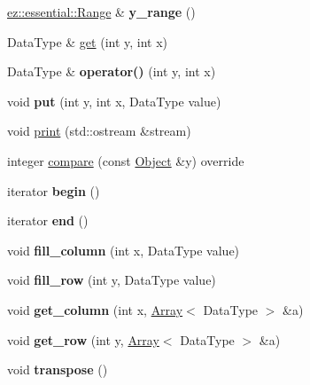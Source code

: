 \begin{DoxyCompactItemize}
\mbox{\label{classez_1_1objects_1_1Matrix2D_a0358977f3d99b47af02fca8b2c9ae698}} 
\hyperlink{classez_1_1essential_1_1Range}{ez\+::essential\+::\+Range} \& {\bfseries y\+\_\+range} ()
\item 
Data\+Type \& \hyperlink{classez_1_1objects_1_1Matrix2D_a43445a3d46105c71f6e212c2b996bced}{get} (int y, int x)
\item 
\mbox{\label{classez_1_1objects_1_1Matrix2D_a6191b365c96c388d82d7a205f979a30e}} 
Data\+Type \& {\bfseries operator()} (int y, int x)
\item 
\mbox{\label{classez_1_1objects_1_1Matrix2D_ab733a21ed5cb3ad3980c15af20ec066a}} 
void {\bfseries put} (int y, int x, Data\+Type value)
\item 
void \hyperlink{classez_1_1objects_1_1Matrix2D_aeef806111fdd458dfcf1f09addd7a0b7}{print} (std\+::ostream \&stream)
\item 
integer \hyperlink{classez_1_1objects_1_1Matrix2D_ab0b55556ba7c31aa5ad376a91b63d6c3}{compare} (const \hyperlink{classez_1_1objects_1_1Object}{Object} \&y) override
\item 
\mbox{\label{classez_1_1objects_1_1Matrix2D_addb8a79fde0fbdf234ffaac900218ad6}} 
iterator {\bfseries begin} ()
\item 
\mbox{\label{classez_1_1objects_1_1Matrix2D_a327f80adc9100fa1f8e484727e970aef}} 
iterator {\bfseries end} ()
\item 
\mbox{\label{classez_1_1objects_1_1Matrix2D_adfe8ae81d04a641df8ec9e7fde7fb622}} 
void {\bfseries fill\+\_\+column} (int x, Data\+Type value)
\item 
\mbox{\label{classez_1_1objects_1_1Matrix2D_aea80758870a92d991ddf71ce15fd254b}} 
void {\bfseries fill\+\_\+row} (int y, Data\+Type value)
\item 
\mbox{\label{classez_1_1objects_1_1Matrix2D_a5e6110ccfbdd8b85e122113b5a347f8e}} 
void {\bfseries get\+\_\+column} (int x, \hyperlink{classez_1_1objects_1_1Array}{Array}$<$ Data\+Type $>$ \&a)
\item 
\mbox{\label{classez_1_1objects_1_1Matrix2D_a8605f64c49804d7364603d47b4e44151}} 
void {\bfseries get\+\_\+row} (int y, \hyperlink{classez_1_1objects_1_1Array}{Array}$<$ Data\+Type $>$ \&a)
\item 
\mbox{\label{classez_1_1objects_1_1Matrix2D_af29b41746bb0bcf4dce2c19c48621352}} 
void {\bfseries transpose} ()
\end{DoxyCompactItemize}
